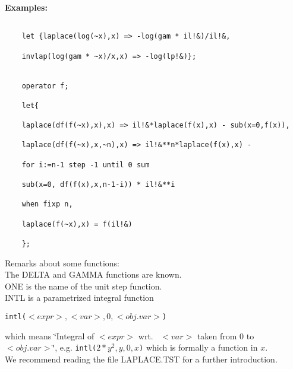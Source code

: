 \pagebreak
\textbf{Examples:}
\begin{verbatim}

    let {laplace(log(~x),x) => -log(gam * il!&)/il!&,

    invlap(log(gam * ~x)/x,x) => -log(lp!&)};


    operator f;

    let{

    laplace(df(f(~x),x),x) => il!&*laplace(f(x),x) - sub(x=0,f(x)),

    laplace(df(f(~x),x,~n),x) => il!&**n*laplace(f(x),x) -

    for i:=n-1 step -1 until 0 sum

    sub(x=0, df(f(x),x,n-1-i)) * il!&**i

    when fixp n,

    laplace(f(~x),x) = f(il!&)

    };

\end{verbatim}


Remarks about some functions: \\[\baselineskip]
The DELTA and GAMMA functions are known. \\
ONE is the name of the unit step function. \\
INTL is a parametrized integral function 
\begin{center}
\texttt{intl($<expr>,<var>,0,<obj.var>$)}
\end{center}
which means \char`\"{}Integral of $<expr>$ wrt.~ $<var>$ taken from 0 to $<obj.var>$\char`\"{},
e.g. {\tt intl($2{*}y^2,y,0,x$)} which is formally a function in $x$.\\
We recommend reading the file LAPLACE.TST for a further introduction.
